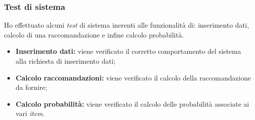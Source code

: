 \subsubsection{Test di sistema}
Ho effettuato alcuni \emph{test} di sistema inerenti alle funzionalità di: inserimento dati, calcolo di una raccomandazione e infine calcolo probabilità.
\begin{itemize}
\item \textbf{Inserimento dati:} viene verificato il corretto comportamento del sistema alla richiesta di inserimento dati;
\item \textbf{Calcolo raccomandazioni:} viene verificato il calcolo della raccomandazione da fornire;
\item \textbf{Calcolo probabilità:} viene verificato il calcolo delle probabilità associate ai vari \emph{item}.
\end{itemize}




\newpage
